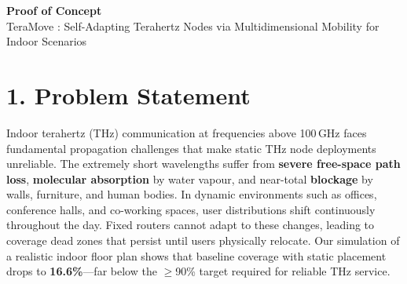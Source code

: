 \documentclass[12pt,a4paper]{article}
\begin{document}
\begin{center}
{\LARGE \textbf{Proof of Concept}}\\[0.6em]
{\large TeraMove : Self-Adapting Terahertz Nodes via Multidimensional Mobility for Indoor Scenarios}\\[1.2em]


\end{center}

\vspace{1.5em}


\section{1. Problem Statement}
Indoor terahertz (THz) communication at frequencies above 100\,GHz faces fundamental propagation challenges that make static THz node deployments unreliable. The extremely short wavelengths suffer from \textbf{severe free-space path loss}, \textbf{molecular absorption} by water vapour, and near-total \textbf{blockage} by walls, furniture, and human bodies. In dynamic environments such as offices, conference halls, and co-working spaces, user distributions shift continuously throughout the day. Fixed routers cannot adapt to these changes, leading to coverage dead zones that persist until users physically relocate. Our simulation of a realistic indoor floor plan shows that baseline coverage with static placement drops to \textbf{16.6\%}---far below the $\geq$90\% target required for reliable THz service.
\end{document}
